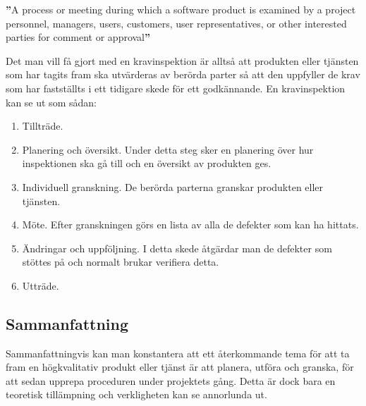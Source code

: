 \begin{tcolorbox}[boxrule=1pt,leftrule=5pt,arc=0pt,auto outer arc]
\textbf{''}A process or meeting during which a software product is examined by a project personnel, managers, users, customers, user representatives, or other interested parties for comment or approval\textbf{''} \cite{SFSR}
\end{tcolorbox}

\noindent
Det man vill få gjort med en kravinspektion är alltså att produkten eller tjänsten som har tagits fram ska utvärderas av berörda parter så att den  uppfyller de krav som har fastställts i ett tidigare skede för ett godkännande. En kravinspektion kan se ut som sådan:
\begin{enumerate}
\item{Tillträde.}
\item{Planering och översikt. Under detta steg sker en planering över hur inspektionen ska gå till och en översikt av produkten ges.}
\item{Individuell granskning. De berörda parterna granskar produkten eller tjänsten.}
\item{Möte. Efter granskningen görs en lista av alla de defekter som kan ha hittats.}
\item{Ändringar och uppföljning. I detta skede åtgärdar man de defekter som stöttes på och normalt brukar verifiera detta.}
\item{Utträde.}
\end{enumerate}

\subsection{Sammanfattning}
Sammanfattningvis kan man konstantera att ett återkommande tema för att ta fram en högkvalitativ produkt eller tjänst är att planera, utföra och granska, för att sedan upprepa proceduren under projektets gång. Detta är dock bara en teoretisk tillämpning och verkligheten kan se annorlunda ut.
